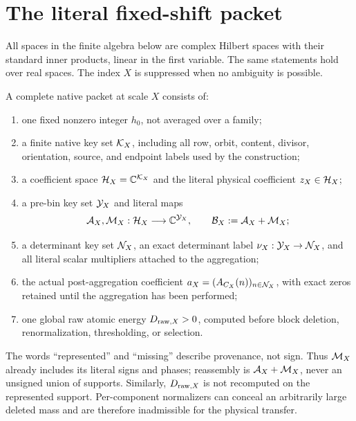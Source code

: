 \section{The literal fixed-shift packet}
\label{sec:literal-packet}

All spaces in the finite algebra below are complex Hilbert spaces with
their standard inner products, linear in the first variable.  The
same statements hold over real spaces.  The index \(X\) is suppressed
when no ambiguity is possible.

\begin{definition}
\label{def:complete-packet}
A complete native packet at scale \(X\) consists of:
\begin{enumerate}[label=(P\arabic*),leftmargin=2.7em]
\item one fixed nonzero integer \(h_0\), not averaged over a family;
\item a finite native key set \(\mathcal K_X\), including all row, orbit,
content, divisor, orientation, source, and endpoint labels used by
the construction;
\item a coefficient space \(\mathcal H_X=\mathbb C^{\mathcal K_X}\) and the literal
physical coefficient \(z_X\in\mathcal H_X\);
\item a pre-bin key set \(\mathcal Y_X\) and literal maps
\[
 \mathcal A_X,\mathcal M_X:\mathcal H_X\longrightarrow\mathbb C^{\mathcal Y_X},
 \qquad
 \mathcal B_X:=\mathcal A_X+\mathcal M_X;
\]
\item a determinant key set \(\mathcal N_X\), an exact determinant label
\(\nu_X:\mathcal Y_X\to\mathcal N_X\), and all literal scalar multipliers attached
to the aggregation;
\item the actual post-aggregation coefficient
\(a_X=(A_{C_X}(n))_{n\in\mathcal N_X}\), with exact zeros retained until the
aggregation has been performed;
\item one global raw atomic energy \(D_{{\rm raw},X}>0\), computed
before block deletion, renormalization, thresholding, or selection.
\end{enumerate}
\end{definition}

The words ``represented'' and ``missing'' describe provenance, not
sign.  Thus \(\mathcal M_X\) already includes its literal signs and phases;
reassembly is \(\mathcal A_X+\mathcal M_X\), never an unsigned union of supports.
Similarly, \(D_{{\rm raw},X}\) is not recomputed on the represented
support.  Per-component normalizers can conceal an arbitrarily large
deleted mass and are therefore inadmissible for the physical transfer.

